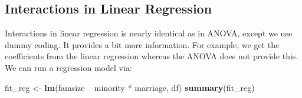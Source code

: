 \documentclass[]{tufte-book}
\newenvironment{Shaded}{}{}
\newcommand{\KeywordTok}[1]{\textcolor[rgb]{0.00,0.44,0.13}{\textbf{#1}}}
\newcommand{\StringTok}[1]{\textcolor[rgb]{0.25,0.44,0.63}{#1}}
\newcommand{\OperatorTok}[1]{\textcolor[rgb]{0.40,0.40,0.40}{#1}}
\newcommand{\NormalTok}[1]{#1}
\theoremstyle{definition}
\theoremstyle{definition}
\theoremstyle{remark}
\begin{document}
\subsection*{Interactions in Linear
Regression}\label{interactions-in-linear-regression}

Interactions in linear regression is nearly identical as in ANOVA,
except we use dummy coding. It provides a bit more information. For
example, we get the coefficients from the linear regression whereas the
ANOVA does not provide this. We can run a regression model via:

\begin{Shaded}
\begin{Highlighting}[]
\NormalTok{fit_reg <-}\StringTok{ }\KeywordTok{lm}\NormalTok{(famsize }\OperatorTok{~}\StringTok{ }\NormalTok{minority }\OperatorTok{*}\StringTok{ }\NormalTok{marriage, df)}
\KeywordTok{summary}\NormalTok{(fit_reg)}
\end{Highlighting}
\end{Shaded}
\end{document}
